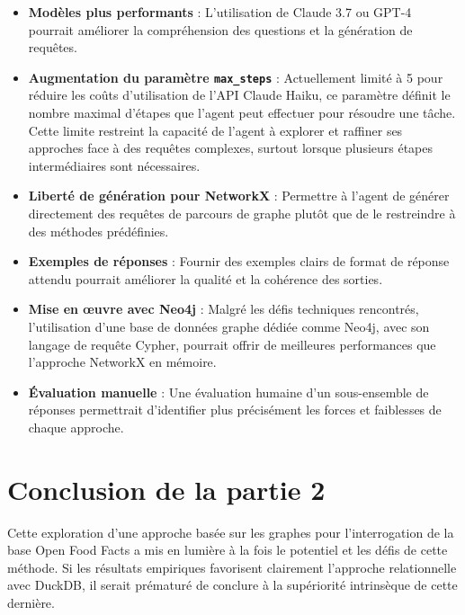 \documentclass[a4paper,11pt]{article}
\begin{document}
\begin{itemize}
    \item \textbf{Modèles plus performants} : L'utilisation de Claude 3.7 ou GPT-4 pourrait améliorer la compréhension des questions et la génération de requêtes.
    
    \item \textbf{Augmentation du paramètre \texttt{max\_steps}} : Actuellement limité à 5 pour réduire les coûts d'utilisation de l'API Claude Haiku, ce paramètre définit le nombre maximal d'étapes que l'agent peut effectuer pour résoudre une tâche. Cette limite restreint la capacité de l'agent à explorer et raffiner ses approches face à des requêtes complexes, surtout lorsque plusieurs étapes intermédiaires sont nécessaires.
    
    
    \item \textbf{Liberté de génération pour NetworkX} : Permettre à l'agent de générer directement des requêtes de parcours de graphe plutôt que de le restreindre à des méthodes prédéfinies.
    
    \item \textbf{Exemples de réponses} : Fournir des exemples clairs de format de réponse attendu pourrait améliorer la qualité et la cohérence des sorties.
    
    \item \textbf{Mise en œuvre avec Neo4j} : Malgré les défis techniques rencontrés, l'utilisation d'une base de données graphe dédiée comme Neo4j, avec son langage de requête Cypher, pourrait offrir de meilleures performances que l'approche NetworkX en mémoire.
    
    \item \textbf{Évaluation manuelle} : Une évaluation humaine d'un sous-ensemble de réponses permettrait d'identifier plus précisément les forces et faiblesses de chaque approche.
\end{itemize}

\section{Conclusion de la partie 2}
\label{sec:conclusion-partie2}

Cette exploration d'une approche basée sur les graphes pour l'interrogation de la base Open Food Facts a mis en lumière à la fois le potentiel et les défis de cette méthode. Si les résultats empiriques favorisent clairement l'approche relationnelle avec DuckDB, il serait prématuré de conclure à la supériorité intrinsèque de cette dernière.
\end{document}
